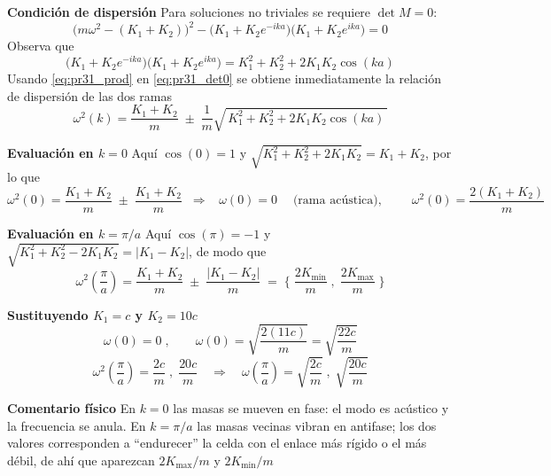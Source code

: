 \documentclass{article}
\begin{document}
\noindent\textbf{Condición de dispersión}\;
Para soluciones no triviales se requiere $\det M=0$:
\begin{equation}
\big(m\omega^2-(K_1+K_2)\big)^2 - \big(K_1 + K_2 e^{-ika}\big)\big(K_1 + K_2 e^{ika}\big)=0
\label{eq:pr31_det0}
\end{equation}
Observa que
\begin{equation}
\big(K_1 + K_2 e^{-ika}\big)\big(K_1 + K_2 e^{ika}\big)=K_1^2 + K_2^2 + 2K_1K_2\cos(ka)
\label{eq:pr31_prod}
\end{equation}
Usando \eqref{eq:pr31_prod} en \eqref{eq:pr31_det0} se obtiene inmediatamente la relación de dispersión de las dos ramas
\begin{equation}
\boxed{\;\omega^2(k)=\frac{K_1+K_2}{m}\;\pm\;\frac{1}{m}\sqrt{\,K_1^2+K_2^2+2K_1K_2\cos(ka)\,}\;}
\label{eq:pr31_disp_general}
\end{equation}

\noindent\textbf{Evaluación en $k=0$}\; Aquí $\cos(0)=1$ y $\sqrt{K_1^2+K_2^2+2K_1K_2} = K_1+K_2$, por lo que
\begin{equation}
\omega^2(0)=\frac{K_1+K_2}{m}\;\pm\;\frac{K_1+K_2}{m}
\;\;\Rightarrow\;\;
\boxed{\;\omega(0)=0\;}\quad\text{(rama acústica)},\qquad
\boxed{\;\omega^2(0)=\frac{2(K_1+K_2)}{m}\;}
\label{eq:pr31_k0}
\end{equation}

\noindent\textbf{Evaluación en $k=\pi/a$}\; Aquí $\cos(\pi)=-1$ y
$\sqrt{K_1^2+K_2^2-2K_1K_2}=\lvert K_1-K_2\rvert$, de modo que
\begin{equation}
\omega^2\!\left(\frac{\pi}{a}\right)=\frac{K_1+K_2}{m}\;\pm\;\frac{|K_1-K_2|}{m}
\;=\;\Big\{\;\frac{2K_{\min}}{m}\;,\;\frac{2K_{\max}}{m}\;\Big\}
\label{eq:pr31_kpia}
\end{equation}

\noindent\textbf{Sustituyendo $K_1=c$ y $K_2=10c$}\;
\begin{equation}
\boxed{\;\omega(0)=0\;,\qquad \omega(0)=\sqrt{\frac{2(11c)}{m}}=\sqrt{\frac{22c}{m}}\;}
\label{eq:pr31_final_0}
\end{equation}
\begin{equation}
\boxed{\;\omega^2\!\left(\frac{\pi}{a}\right)=\frac{2c}{m}\;,\;\frac{20c}{m}
\quad\Rightarrow\quad
\omega\!\left(\frac{\pi}{a}\right)=\sqrt{\frac{2c}{m}}\;,\;\sqrt{\frac{20c}{m}}\;}
\label{eq:pr31_final_pia}
\end{equation}

\noindent\textbf{Comentario físico}\; En $k=0$ las masas se mueven en fase: el modo es acústico y la frecuencia se anula. En $k=\pi/a$ las masas vecinas vibran en antifase; los dos valores corresponden a “endurecer” la celda con el enlace más rígido o el más débil, de ahí que aparezcan $2K_{\max}/m$ y $2K_{\min}/m$
\end{document}
